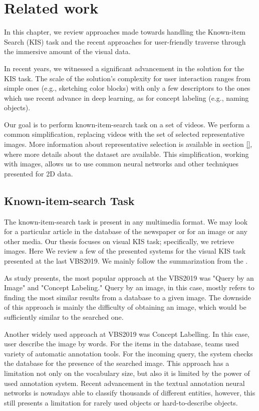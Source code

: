 \chapter{Related work}
\label{ch:related_work}


In this chapter, we review approaches made towards handling the Known-item Search (KIS) task and the recent approaches for user-friendly traverse through the immersive amount of the visual data.

In recent years, we witnessed a significant advancement in the solution for the KIS task. The scale of the solution's complexity for user interaction ranges from simple ones (e.g., sketching color blocks) with only a few descriptors to the ones which use recent advance in deep learning, as for concept labeling (e.g., naming objects).

Our goal is to perform known-item-search task on a set of videos. We perform a common simplification, replacing videos with the set of selected representative images. More information about representative selection is available in section \ref{}, where more details about the dataset are available. This simplification, working with images, allows us to use common neural networks and other techniques presented for 2D data.

\section*{Known-item-search Task}

The known-item-search task is present in any multimedia format. We may look for a particular article in the database of the newspaper or for an image or any other media. Our thesis focuses on visual KIS task; specifically, we retrieve images. Here We review a few of the presented systems for the visual KIS task presented at the last VBS2019. We mainly follow the summarization from the \cite{rossetto2020interactive}.

As study presents, the most popular approach at the VBS2019 was "Query by an Image" and "Concept Labeling." Query by an image, in this case, mostly refers to finding the most similar results from a database to a given image. The downside of this approach is mainly the difficulty of obtaining an image, which would be sufficiently similar to the searched one.

Another widely used approach at VBS2019 was Concept Labelling. In this case, user describe the image by words. For the items in the database, teams used variety of automatic annotation tools. For the incoming query, the system checks the database for the presence of the searched image. This approach has a limitation not only on the vocabulary size, but also it is limited by the power of used annotation system. Recent advancement in the textual annotation neural networks is nowadays able to classify thousands of different entities, however, this still presents a limitation for rarely used objects or hard-to-describe objects.

